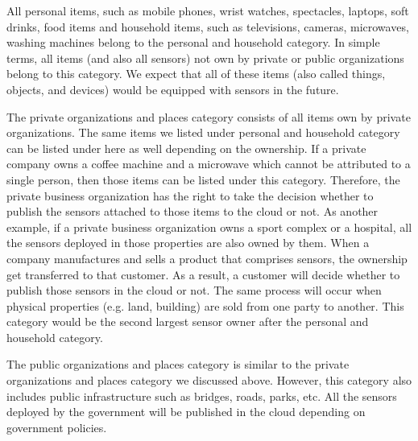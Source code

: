 \documentclass[times]{ettauth}
\newenvironment{noindlist}
 {\begin{list}{\labelitemi}{\leftmargin=1.2em \itemindent=-.5em}}
 {\end{list}}
\begin{document}
\begin{noindlist}
\item All  personal items, such as mobile phones, wrist watches, spectacles, laptops, soft drinks, food items and household items, such as televisions, cameras, microwaves, washing machines belong to the personal and household category. In simple terms, all  items (and also all sensors) not own by private or public organizations belong to this category. We expect that all of these items (also called things, objects, and devices) would be equipped with sensors in the future.


\item The private organizations and places category consists of all  items own by private organizations. The same items we listed under personal and household category can be listed under here as well depending on the ownership. If a private company owns a coffee machine and a microwave which cannot be attributed to a single person, then those items can be listed under this category. Therefore, the private business organization has the right to take the decision whether to publish the sensors attached to those items to the cloud or not. As another example, if a private business organization owns a sport complex or a hospital, all the sensors deployed in those properties are also owned by them. When a company manufactures and sells a product that comprises sensors, the ownership get transferred to that customer. As a result, a customer will decide whether to publish those sensors in the cloud or not. The same process will occur when physical properties (e.g. land, building) are sold from one party to another. This category would be the second largest sensor  owner after the personal and household category. 



\item The public organizations and places category is similar to the private organizations and places category we discussed above. However, this category also includes public infrastructure such as bridges, roads, parks, etc. All the sensors deployed by the government will be published in the cloud depending on government policies.



\end{noindlist}
\end{document}
